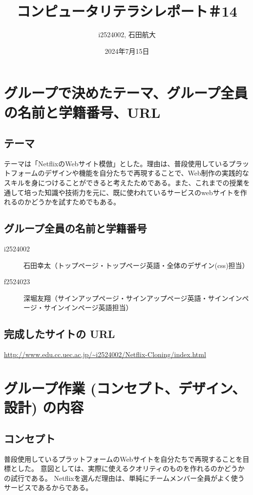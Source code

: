 \documentclass[12pt,a4j]{jarticle}
\begin{document}
\title{コンピュータリテラシレポート＃14}
\author{i2524002, 石田航大}
\date{2024年7月15日}
\maketitle

\section{グループで決めたテーマ、グループ全員の名前と学籍番号、URL}

\subsection{テーマ}
テーマは「NetflixのWebサイト模倣」とした。理由は、普段使用しているプラットフォームのデザインや機能を自分たちで再現することで、Web制作の実践的なスキルを身につけることができると考えたためである。また、これまでの授業を通して培った知識や技術力を元に、既に使われているサービスのwebサイトを作れるのかどうかを試すためでもある。

\subsection{グループ全員の名前と学籍番号}

\begin{description}
\item[i2524002] 石田幸太（トップページ・トップページ英語・全体のデザイン(css)担当）
\item[f2524023] 深堀友翔（サインアップページ・サインアップページ英語・サインインページ・サインインページ英語担当）
\end{description}

\subsection{完成したサイトの URL}

\url{http://www.edu.cc.uec.ac.jp/~i2524002/Netflix-Cloning/index.html}


\section{グループ作業 (コンセプト、デザイン、設計) の内容}

\subsection{コンセプト}
普段使用しているプラットフォームのWebサイトを自分たちで再現することを目標とした。
意図としては、実際に使えるクオリティのものを作れるのかどうかの試行である。
Netflixを選んだ理由は、単純にチームメンバー全員がよく使うサービスであるからである。
\end{document}
